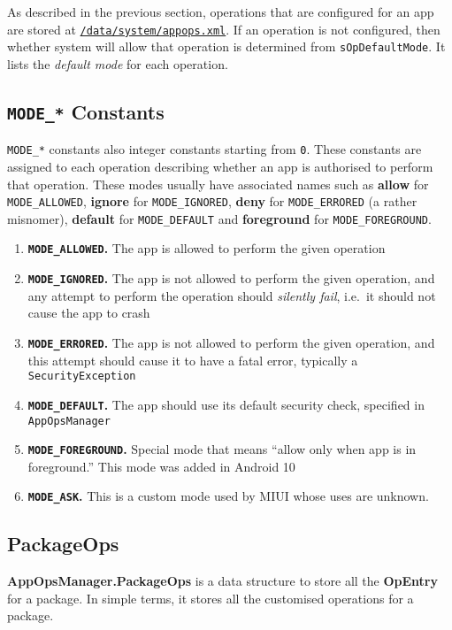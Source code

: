 As described in the previous section, operations that are configured for an app are stored at
\hyperref[sec:appops-xml]{\texttt{/data/system/appops.xml}}.
If an operation is not configured, then whether system will allow that operation is determined from \texttt{sOpDefaultMode}.
It lists the \textit{default mode} for each operation.

\subsection{\texttt{MODE\_*} Constants}\label{subsec:mode-constants}
\texttt{MODE\_*} constants also integer constants starting from \texttt{0}. These constants are assigned to each
operation describing whether an app is authorised to perform that operation. These modes usually have associated names
such as \textbf{allow} for \texttt{MODE\_ALLOWED}, \textbf{ignore} for \texttt{MODE\_IGNORED}, \textbf{deny} for
\texttt{MODE\_ERRORED} (a rather misnomer), \textbf{default} for \texttt{MODE\_DEFAULT} and \textbf{foreground}
for \texttt{MODE\_FOREGROUND}.

\begin{enumerate}
    \addtocounter{enumi}{-1}
    \item \textbf{\texttt{MODE\_ALLOWED}.} The app is allowed to perform the given operation
    \item \textbf{\texttt{MODE\_IGNORED}.} The app is not allowed to perform the given operation, and any attempt to
    perform the operation should \emph{silently fail}, i.e.\ it should not cause the app to crash
    \item \textbf{\texttt{MODE\_ERRORED}.} The app is not allowed to perform the given operation, and this attempt
    should cause it to have a fatal error, typically a \texttt{SecurityException}
    \item \textbf{\texttt{MODE\_DEFAULT}.} The app should use its default security check, specified in \texttt{AppOpsManager}
    \item \textbf{\texttt{MODE\_FOREGROUND}.} Special mode that means ``allow only when app is in foreground.''
    This mode was added in Android 10
    \item \textbf{\texttt{MODE\_ASK}.} This is a custom mode used by MIUI whose uses are unknown.
\end{enumerate}

\subsection{PackageOps}\label{subsec:package-ops}
\textbf{AppOpsManager.PackageOps} is a data structure to store all the \textbf{OpEntry} for a package. In simple terms,
it stores all the customised operations for a package.

